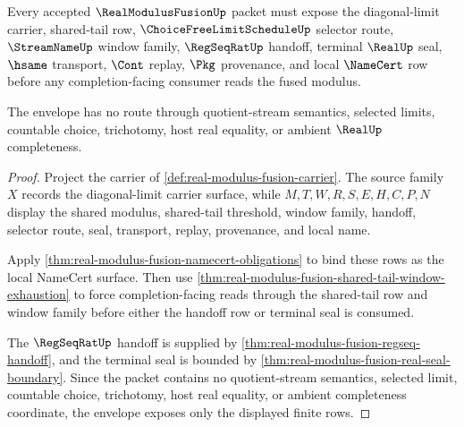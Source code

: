 \begin{theorem}
\label{thm:real-modulus-fusion-obligation-envelope}
Every accepted $\RealModulusFusionUp$ packet must expose the diagonal-limit carrier, shared-tail row, $\ChoiceFreeLimitScheduleUp$ selector route, $\StreamNameUp$ window family, $\RegSeqRatUp$ handoff, terminal $\RealUp$ seal, $\hsame$ transport, $\Cont$ replay, $\Pkg$ provenance, and local $\NameCert$ row before any completion-facing consumer reads the fused modulus.

The envelope has no route through quotient-stream semantics, selected limits, countable choice, trichotomy, host real equality, or ambient $\RealUp$ completeness.
\end{theorem}
\begin{proof}
Project the carrier of \autoref{def:real-modulus-fusion-carrier}. The source family $X$ records the diagonal-limit carrier surface, while $M,T,W,R,S,E,H,C,P,N$ display the shared modulus, shared-tail threshold, window family, handoff, selector route, seal, transport, replay, provenance, and local name.

Apply \autoref{thm:real-modulus-fusion-namecert-obligations} to bind these rows as the local NameCert surface. Then use \autoref{thm:real-modulus-fusion-shared-tail-window-exhaustion} to force completion-facing reads through the shared-tail row and window family before either the handoff row or terminal seal is consumed.

The $\RegSeqRatUp$ handoff is supplied by \autoref{thm:real-modulus-fusion-regseq-handoff}, and the terminal seal is bounded by \autoref{thm:real-modulus-fusion-real-seal-boundary}. Since the packet contains no quotient-stream semantics, selected limit, countable choice, trichotomy, host real equality, or ambient completeness coordinate, the envelope exposes only the displayed finite rows.
\end{proof}

